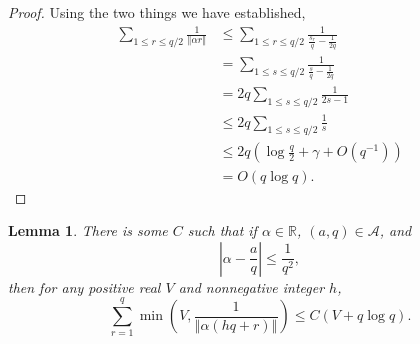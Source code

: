 \documentclass{amsart}
\newcommand{\norm}[1]{\left\Vert #1 \right\Vert}
\newtheorem{lemma}[theorem]{Lemma}
\begin{document}
\begin{proof}
Using the two things we have established, 
\begin{align*}
\sum_{1 \leq r \leq q/2} \frac{1}{\norm{\alpha r}}&\leq \sum_{1 \leq r \leq q/2} \frac{1}{\frac{s_r}{q}-\frac{1}{2q}}\\
&=\sum_{1 \leq s \leq q/2} \frac{1}{\frac{s}{q}-\frac{1}{2q}}\\
&= 2q \sum_{1 \leq s \leq q/2}  \frac{1}{2s-1}\\
&\leq 2q \sum_{1 \leq s \leq q/2} \frac{1}{s}\\
&\leq 2q \left( \log \frac{q}{2} + \gamma + O(q^{-1}) \right)\\
&=O(q \log q).
\end{align*}
\end{proof}



\begin{lemma}
There is some $C$ such that if $\alpha \in \mathbb{R}$, $(a,q) \in \mathscr{A}$, and
\[
\left|\alpha - \frac{a}{q} \right| \leq \frac{1}{q^2},
\]
then for any positive real $V$ and nonnegative integer $h$,
\[
\sum_{r=1}^q \min\left(V,\frac{1}{\norm{\alpha(hq+r)}}\right) \leq C(V+q\log q).
\]
\label{lemma49}
\end{lemma}
\end{document}
